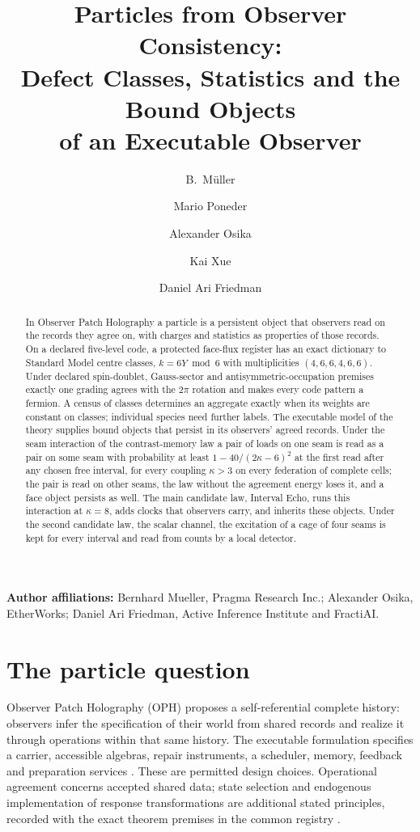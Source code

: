 \documentclass[11pt]{article}
\title{Particles from Observer Consistency:\\
Defect Classes, Statistics and the Bound Objects\\
of an Executable Observer}
\author{B.\ M\"uller \and Mario Poneder \and Alexander Osika \and Kai Xue \and Daniel Ari Friedman}
\date{\OPHPaperReleaseDate}
\begin{document}
\maketitle
\OPHPaperReleaseBanner

\begin{center}
\small\textbf{Author affiliations:} Bernhard Mueller, Pragma Research Inc.; Alexander Osika, EtherWorks; Daniel Ari Friedman, Active Inference Institute and FractiAI.
\end{center}

\begin{abstract}
In Observer Patch Holography a particle is a persistent object that observers
read on the records they agree on, with charges and statistics as properties
of those records. On a declared five-level code, a protected face-flux
register has an exact dictionary to Standard Model centre classes,
$k=6Y\bmod6$ with multiplicities $(4,6,6,4,6,6)$. Under declared
spin-doublet, Gauss-sector and antisymmetric-occupation premises exactly one
grading agrees with the $2\pi$ rotation and makes every code pattern a
fermion. A census of classes determines an aggregate exactly when its weights
are constant on classes; individual species need further labels. The
executable model of the theory supplies bound objects that persist in its
observers' agreed records. Under the seam interaction of the contrast-memory
law a pair of loads on one seam is read as a pair on some
seam with probability at least $1-40/(2\kappa-6)^2$ at the first read after any chosen free interval, for
every coupling $\kappa>3$ on every federation of complete cells; the pair is
read on other seams, the law without the agreement energy loses it, and a
face object persists as well. The main candidate law, Interval Echo, runs
this interaction at $\kappa=8$, adds clocks that observers carry, and
inherits these objects. Under the second candidate law, the scalar
channel, the excitation of a cage of four seams is kept for every interval
and read from counts by a local detector.
\end{abstract}

\section{The particle question}
\label{sec:particle-hypothesis-place}

Observer Patch Holography (OPH) proposes a self-referential complete history:
observers infer the specification of their world from shared records and
realize it through operations within that same history. The executable
formulation specifies a carrier, accessible algebras, repair
instruments, a scheduler, memory, feedback and preparation services
\cite{ophobservers,ophmodel}. These are permitted design choices. Operational
agreement concerns accepted shared data; state selection and endogenous
implementation of response transformations are additional stated principles,
recorded with the exact theorem premises in the common registry \cite{ophbasis}.
\end{document}
